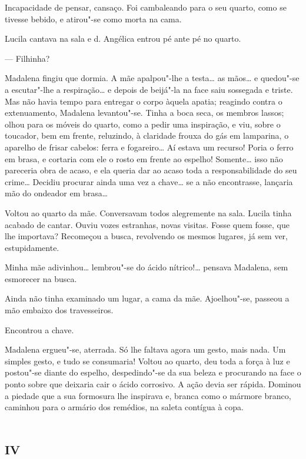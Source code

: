 Incapacidade de pensar, cansaço. Foi cambaleando para o seu quarto, como
se tivesse bebido, e atirou"-se como morta na cama.

Lucila cantava na sala e d. Angélica entrou pé ante pé no quarto.

--- Filhinha?

Madalena fingiu que dormia. A mãe apalpou"-lhe a testa\ldots{} as mãos\ldots{} e
quedou"-se a escutar"-lhe a respiração\ldots{} e depois de beijá"-la na face
saiu sossegada e triste. Mas não havia tempo para entregar o corpo
àquela apatia; reagindo contra o extenuamento, Madalena levantou"-se.
Tinha a boca seca, os membros lassos; olhou para os móveis do quarto,
como a pedir uma inspiração, e viu, sobre o toucador, bem em frente,
reluzindo, à claridade frouxa do gás em lamparina, o aparelho de frisar
cabelos: ferra e fogareiro\ldots{} Aí estava um recurso! Poria o ferro em
brasa, e cortaria com ele o rosto em frente ao espelho! Somente\ldots{} isso
não pareceria obra de acaso, e ela queria dar ao acaso toda a
responsabilidade do seu crime\ldots{} Decidiu procurar ainda uma vez a
chave\ldots{} se a não encontrasse, lançaria mão do ondeador em brasa\ldots{}

Voltou ao quarto da mãe. Conversavam todos alegremente na sala. Lucila
tinha acabado de cantar. Ouviu vozes estranhas, novas visitas. Fosse
quem fosse, que lhe importava? Recomeçou a busca, revolvendo os mesmos
lugares, já sem ver, estupidamente.

Minha mãe adivinhou\ldots{} lembrou"-se do ácido nítrico!\ldots{} pensava Madalena,
sem esmorecer na busca.

Ainda não tinha examinado um lugar, a cama da mãe. Ajoelhou"-se, passeou
a mão embaixo dos travesseiros.

Encontrou a chave.

Madalena ergueu"-se, aterrada. Só lhe faltava agora um gesto, mais nada.
Um simples gesto, e tudo se consumaria! Voltou ao quarto, deu toda a
força à luz e postou"-se diante do espelho, despedindo"-se da sua beleza e
procurando na face o ponto sobre que deixaria cair o ácido corrosivo. A
ação devia ser rápida. Dominou a piedade que a sua formosura lhe
inspirava e, branca como o mármore branco, caminhou para o armário dos
remédios, na saleta contígua à copa.

\section*{\textsc{iv}}

